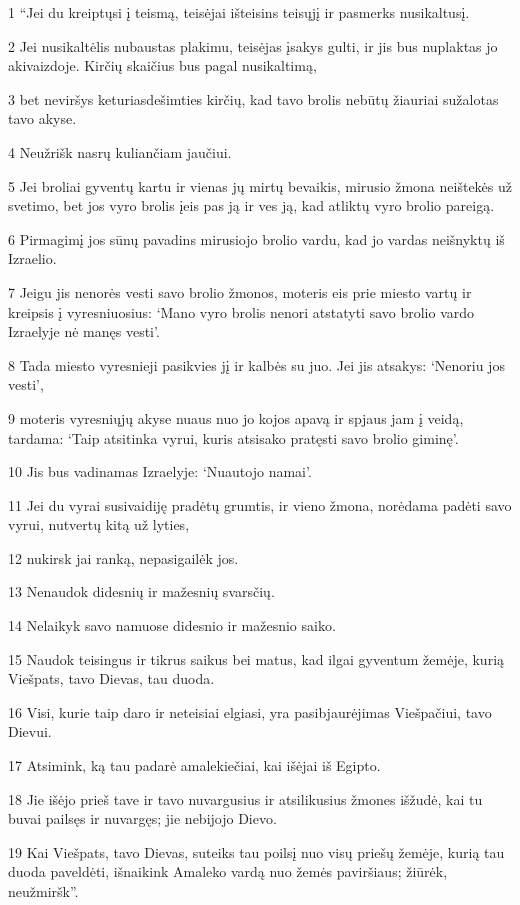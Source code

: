 \par 1 “Jei du kreiptųsi į teismą, teisėjai išteisins teisųjį ir pasmerks nusikaltusį. 
\par 2 Jei nusikaltėlis nubaustas plakimu, teisėjas įsakys gulti, ir jis bus nuplaktas jo akivaizdoje. Kirčių skaičius bus pagal nusikaltimą, 
\par 3 bet neviršys keturiasdešimties kirčių, kad tavo brolis nebūtų žiauriai sužalotas tavo akyse. 
\par 4 Neužrišk nasrų kuliančiam jaučiui. 
\par 5 Jei broliai gyventų kartu ir vienas jų mirtų bevaikis, mirusio žmona neištekės už svetimo, bet jos vyro brolis įeis pas ją ir ves ją, kad atliktų vyro brolio pareigą. 
\par 6 Pirmagimį jos sūnų pavadins mirusiojo brolio vardu, kad jo vardas neišnyktų iš Izraelio. 
\par 7 Jeigu jis nenorės vesti savo brolio žmonos, moteris eis prie miesto vartų ir kreipsis į vyresniuosius: ‘Mano vyro brolis nenori atstatyti savo brolio vardo Izraelyje nė manęs vesti’. 
\par 8 Tada miesto vyresnieji pasikvies jį ir kalbės su juo. Jei jis atsakys: ‘Nenoriu jos vesti’, 
\par 9 moteris vyresniųjų akyse nuaus nuo jo kojos apavą ir spjaus jam į veidą, tardama: ‘Taip atsitinka vyrui, kuris atsisako pratęsti savo brolio giminę’. 
\par 10 Jis bus vadinamas Izraelyje: ‘Nuautojo namai’. 
\par 11 Jei du vyrai susivaidiję pradėtų grumtis, ir vieno žmona, norėdama padėti savo vyrui, nutvertų kitą už lyties, 
\par 12 nukirsk jai ranką, nepasigailėk jos. 
\par 13 Nenaudok didesnių ir mažesnių svarsčių. 
\par 14 Nelaikyk savo namuose didesnio ir mažesnio saiko. 
\par 15 Naudok teisingus ir tikrus saikus bei matus, kad ilgai gyventum žemėje, kurią Viešpats, tavo Dievas, tau duoda. 
\par 16 Visi, kurie taip daro ir neteisiai elgiasi, yra pasibjaurėjimas Viešpačiui, tavo Dievui. 
\par 17 Atsimink, ką tau padarė amalekiečiai, kai išėjai iš Egipto. 
\par 18 Jie išėjo prieš tave ir tavo nuvargusius ir atsilikusius žmones išžudė, kai tu buvai pailsęs ir nuvargęs; jie nebijojo Dievo. 
\par 19 Kai Viešpats, tavo Dievas, suteiks tau poilsį nuo visų priešų žemėje, kurią tau duoda paveldėti, išnaikink Amaleko vardą nuo žemės paviršiaus; žiūrėk, neužmiršk”.



